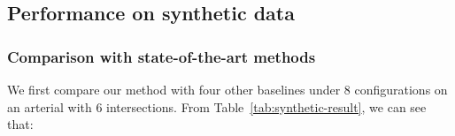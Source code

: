 \subsection{Performance on synthetic data}

\subsubsection{Comparison with state-of-the-art methods} 




We first compare our method with four other baselines under 8 configurations on an arterial with 6 intersections. From Table~\ref{tab:synthetic-result}, we can see that: 

